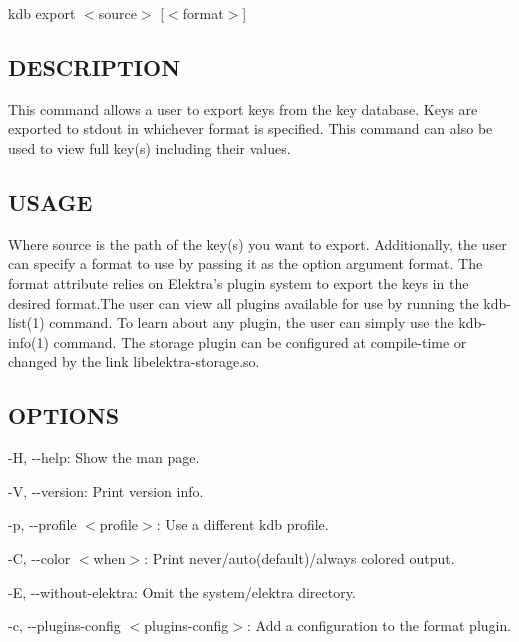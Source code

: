 {\ttfamily kdb export $<$source$>$ \mbox{[}$<$format$>$\mbox{]}}

\subsection*{D\+E\+S\+C\+R\+I\+P\+T\+I\+ON}

This command allows a user to export keys from the key database. Keys are exported to {\ttfamily stdout} in whichever format is specified. This command can also be used to view full key(s) including their values.

\subsection*{U\+S\+A\+GE}

Where {\ttfamily source} is the path of the key(s) you want to export. Additionally, the user can specify a format to use by passing it as the option argument {\ttfamily format}. The {\ttfamily format} attribute relies on Elektra’s plugin system to export the keys in the desired format.\+The user can view all plugins available for use by running the kdb-\/list(1) command. To learn about any plugin, the user can simply use the kdb-\/info(1) command. The {\ttfamily storage} plugin can be configured at compile-\/time or changed by the link {\ttfamily libelektra-\/storage.\+so}.

\subsection*{O\+P\+T\+I\+O\+NS}


\begin{DoxyItemize}
\item {\ttfamily -\/H}, {\ttfamily -\/-\/help}\+: Show the man page.
\item {\ttfamily -\/V}, {\ttfamily -\/-\/version}\+: Print version info.
\item {\ttfamily -\/p}, {\ttfamily -\/-\/profile $<$profile$>$}\+: Use a different kdb profile.
\item {\ttfamily -\/C}, {\ttfamily -\/-\/color $<$when$>$}\+: Print never/auto(default)/always colored output.
\item {\ttfamily -\/E}, {\ttfamily -\/-\/without-\/elektra}\+: Omit the {\ttfamily system/elektra} directory.
\item {\ttfamily -\/c}, {\ttfamily -\/-\/plugins-\/config $<$plugins-\/config$>$}\+: Add a configuration to the format plugin.
\end{DoxyItemize}

